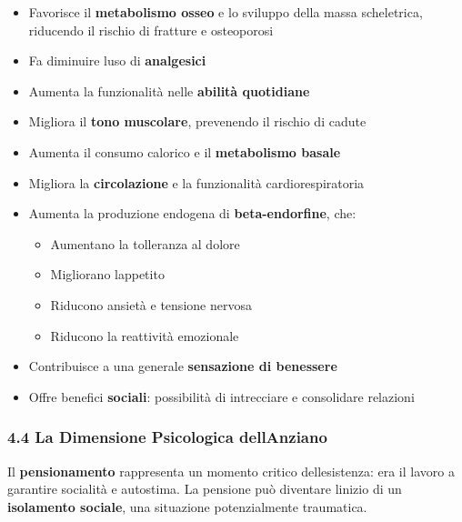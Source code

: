 \documentclass[a4paper,11pt]{article}
\providecommand{\tightlist}{%
  \setlength{\itemsep}{0pt}\setlength{\parskip}{0pt}}
\begin{document}
\begin{itemize}
      \tightlist
      \item
            Favorisce il \textbf{metabolismo osseo} e lo sviluppo della massa
            scheletrica, riducendo il rischio di fratture e osteoporosi
      \item
            Fa diminuire l\textquotesingle uso di \textbf{analgesici}
      \item
            Aumenta la funzionalità nelle \textbf{abilità quotidiane}
      \item
            Migliora il \textbf{tono muscolare}, prevenendo il rischio di cadute
      \item
            Aumenta il consumo calorico e il \textbf{metabolismo basale}
      \item
            Migliora la \textbf{circolazione} e la funzionalità cardiorespiratoria
      \item
            Aumenta la produzione endogena di \textbf{beta-endorfine}, che:

            \begin{itemize}
                  \tightlist
                  \item
                        Aumentano la tolleranza al dolore
                  \item
                        Migliorano l\textquotesingle appetito
                  \item
                        Riducono ansietà e tensione nervosa
                  \item
                        Riducono la reattività emozionale
            \end{itemize}
      \item
            Contribuisce a una generale \textbf{sensazione di benessere}
      \item
            Offre benefici \textbf{sociali}: possibilità di intrecciare e
            consolidare relazioni
\end{itemize}

\subsubsection{4.4 La Dimensione Psicologica
      dell\textquotesingle Anziano}\label{la-dimensione-psicologica-dellanziano}

Il \textbf{pensionamento} rappresenta un momento critico
dell\textquotesingle esistenza: era il lavoro a garantire socialità e
autostima. La pensione può diventare l\textquotesingle inizio di un
\textbf{isolamento sociale}, una situazione potenzialmente traumatica.
\end{document}
